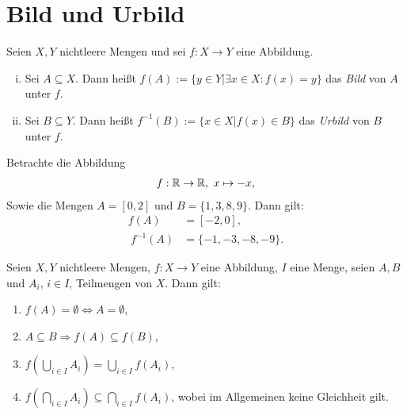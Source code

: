 \section{Bild und Urbild} 

\begin{mydef}
    Seien $X,Y$ nichtleere Mengen und sei $f:X \to Y$ eine Abbildung. 
    \begin{enumerate}[(i)]
        \item 
        Sei $A \subseteq X$. Dann heißt $f(A):=\{y \in Y | \exists x \in X : f(x) = y \}$ das \textit{Bild} von $A$ unter $f$. 
        \item 
        Sei $B \subseteq Y$. Dann heißt $f^{-1}(B):=\{x \in X | f(x) \in B \}$ das \textit{Urbild} von $B$ unter $f$. 
    \end{enumerate}
\end{mydef}

\begin{example}
    Betrachte die Abbildung 
    \begin{align*}
        f: \mathbb{R} \to \mathbb{R}, \ x \mapsto -x,
    \end{align*}
    Sowie die Mengen $A = [0,2]$ und $B = \{1,3,8,9\}$. Dann gilt: 
    \begin{align*}
        f(A) &= [-2,0], \\\
        f^{-1}(A) &= \{-1, -3,-8,-9\}. 
    \end{align*}
\end{example}

\begin{theorem}
    Seien $X,Y$ nichtleere Mengen, $f:X \to Y$ eine Abbildung, $I$ eine Menge, seien $A,B$ und $A_i$, $i \in I$, Teilmengen von $X$. Dann gilt: 
    \begin{enumerate}
        \item
        $f(A) = \emptyset \iff A = \emptyset$, 
        \item 
        $A \subseteq B \Rightarrow f(A) \subseteq f(B)$,
        \item 
        $ f(\bigcup_{i \in I}A_i) = \bigcup_{i \in I}f(A_i)$,
        \item 
        $ f(\bigcap_{i \in I}A_i) \subseteq \bigcap_{i \in I}f(A_i)$, wobei im Allgemeinen keine Gleichheit gilt. 
    \end{enumerate}
\end{theorem}

\begin{proof*}
\end{proof*}

